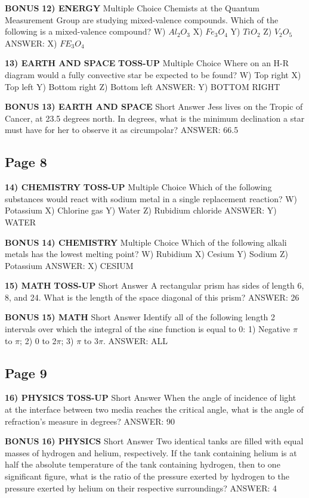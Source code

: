 \documentclass{article}
\begin{document}
\textbf{BONUS}
\textbf{12) ENERGY}
Multiple Choice Chemists at the Quantum Measurement Group are studying mixed-valence compounds. Which of the following is a mixed-valence compound?
W) $Al_{2}O_{3}$
X) $Fe_{3}O_{4}$
Y) $TiO_{2}$
Z) $V_{2}O_{5}$
ANSWER: X) $FE_{3}O_{4}$

\textbf{13) EARTH AND SPACE}
\textbf{TOSS-UP}
Multiple Choice Where on an H-R diagram would a fully convective star be expected to be found?
W) Top right
X) Top left
Y) Bottom right
Z) Bottom left
ANSWER: Y) BOTTOM RIGHT

\textbf{BONUS}
\textbf{13) EARTH AND SPACE}
Short Answer Jess lives on the Tropic of Cancer, at 23.5 degrees north. In degrees, what is the minimum declination a star must have for her to observe it as circumpolar?
ANSWER: 66.5

\subsection*{Page 8}
\textbf{14) CHEMISTRY}
\textbf{TOSS-UP}
Multiple Choice Which of the following substances would react with sodium metal in a single replacement reaction?
W) Potassium
X) Chlorine gas
Y) Water
Z) Rubidium chloride
ANSWER: Y) WATER

\textbf{BONUS}
\textbf{14) CHEMISTRY}
Multiple Choice Which of the following alkali metals has the lowest melting point?
W) Rubidium
X) Cesium
Y) Sodium
Z) Potassium
ANSWER: X) CESIUM

\textbf{15) MATH}
\textbf{TOSS-UP}
Short Answer A rectangular prism has sides of length 6, 8, and 24. What is the length of the space diagonal of this prism?
ANSWER: 26

\textbf{BONUS}
\textbf{15) MATH}
Short Answer Identify all of the following length 2 intervals over which the integral of the sine function is equal to 0: 1) Negative $\pi$ to $\pi$; 2) 0 to 2$\pi$; 3) $\pi$ to 3$\pi$.
ANSWER: ALL

\subsection*{Page 9}
\textbf{16) PHYSICS}
\textbf{TOSS-UP}
Short Answer When the angle of incidence of light at the interface between two media reaches the critical angle, what is the angle of refraction's measure in degrees?
ANSWER: 90

\textbf{BONUS}
\textbf{16) PHYSICS}
Short Answer Two identical tanks are filled with equal masses of hydrogen and helium, respectively. If the tank containing helium is at half the absolute temperature of the tank containing hydrogen, then to one significant figure, what is the ratio of the pressure exerted by hydrogen to the pressure exerted by helium on their respective surroundings?
ANSWER: 4
\end{document}

